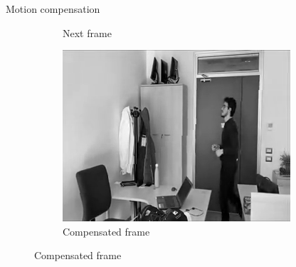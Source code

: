 \documentclass[aspectratio=1610,xcolor=dvipsnames]{beamer}
\begin{document}
\begin{frame}{Motion compensation}
\begin{figure}[htbp]
\begin{subfigure}[b]{0.3\textwidth}
            \caption{Next frame}
            \label{fig:pan240-curr-frame}
        \end{subfigure}
        \hfill
        \begin{subfigure}[b]{0.3\textwidth}
            \includegraphics[width=.9\textwidth]{images/pan240-compensated.png}
            \caption{Compensated frame}
            \label{fig:pan240-compensated}
        \end{subfigure}
        

\end{figure}
\end{frame}
\end{document}
